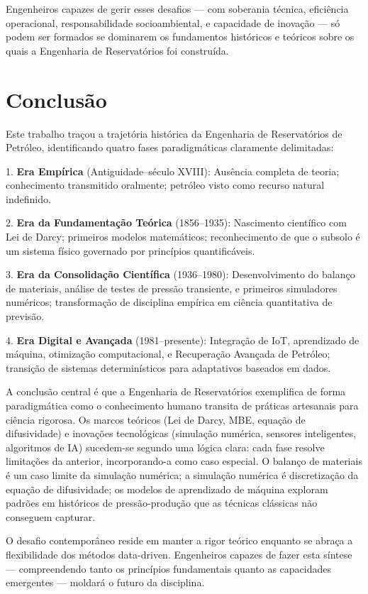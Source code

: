 \documentclass[12pt,a4paper,oneside,brazilian,sumario=tradicional]{abntex2}
\begin{document}
Engenheiros capazes de gerir esses desafios — com soberania técnica, eficiência operacional, responsabilidade socioambiental, e capacidade de inovação — só podem ser formados se dominarem os fundamentos históricos e teóricos sobre os quais a Engenharia de Reservatórios foi construída.



\chapter{Conclusão}

Este trabalho traçou a trajetória histórica da Engenharia de Reservatórios de Petróleo, identificando quatro fases paradigmáticas claramente delimitadas:

1. \textbf{Era Empírica} (Antiguidade--século XVIII): Ausência completa de teoria; conhecimento transmitido oralmente; petróleo visto como recurso natural indefinido.

2. \textbf{Era da Fundamentação Teórica} (1856--1935): Nascimento científico com Lei de Darcy; primeiros modelos matemáticos; reconhecimento de que o subsolo é um sistema físico governado por princípios quantificáveis.

3. \textbf{Era da Consolidação Científica} (1936--1980): Desenvolvimento do balanço de materiais, análise de testes de pressão transiente, e primeiros simuladores numéricos; transformação de disciplina empírica em ciência quantitativa de previsão.

4. \textbf{Era Digital e Avançada} (1981--presente): Integração de IoT, aprendizado de máquina, otimização computacional, e Recuperação Avançada de Petróleo; transição de sistemas determinísticos para adaptativos baseados em dados.

A conclusão central é que a Engenharia de Reservatórios exemplifica de forma paradigmática como o conhecimento humano transita de práticas artesanais para ciência rigorosa. Os marcos teóricos (Lei de Darcy, MBE, equação de difusividade) e inovações tecnológicas (simulação numérica, sensores inteligentes, algoritmos de IA) sucedem-se segundo uma lógica clara: cada fase resolve limitações da anterior, incorporando-a como caso especial. O balanço de materiais é um caso limite da simulação numérica; a simulação numérica é discretização da equação de difusividade; os modelos de aprendizado de máquina exploram padrões em históricos de pressão-produção que as técnicas clássicas não conseguem capturar.

O desafio contemporâneo reside em manter a rigor teórico enquanto se abraça a flexibilidade dos métodos data-driven. Engenheiros capazes de fazer esta síntese — compreendendo tanto os princípios fundamentais quanto as capacidades emergentes — moldará o futuro da disciplina.

\postextual

\end{document}
